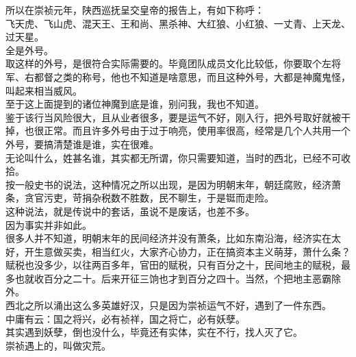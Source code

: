 \begin{multicols}{\theparacolNo}
所以在崇祯元年，陕西巡抚呈交皇帝的报告上，有如下称呼：\\

飞天虎、飞山虎、混天王、王和尚、黑杀神、大红狼、小红狼、一丈青、上天龙、过天星。\\

全是外号。\\

取这样的外号，是很符合实际需要的。毕竟团队成员文化比较低，你要取个左将军、右都督之类的称号，他也不知道是啥意思，而且这种外号，大都是神魔鬼怪，叫起来相当威风。\\

至于这上面提到的诸位神魔到底是谁，别问我，我也不知道。\\

鉴于该行当风险很大，且从业者很多，要是运气不好，刚入行，把外号取好就被干掉，也很正常。而且许多外号由于过于响亮，使用率很高，经常是几个人共用一个外号，要搞清楚谁是谁，实在很难。\\

无论叫什么，姓甚名谁，其实都无所谓，你只需要知道，当时的西北，已经不可收拾。\\

按一般史书的说法，这种情况之所以出现，是因为明朝末年，朝廷腐败，经济萧条，贪官污吏，苛捐杂税数不胜数，民不聊生，于是铤而走险。\\

这种说法，就是传说中的套话，虽说不是废话，也差不多。\\

因为事实并非如此。\\

很多人并不知道，明朝末年的民间经济并没有萧条，比如东南沿海，经济实在太好，开生意做买卖，相当红火，大家齐心协力，正在搞资本主义萌芽，萧什么条？\\

赋税也没多少，以往两百多年，官田的赋税，只有百分之十，民间地主的赋税，最多也就收百分之二十。后来开征三饷也才到百分之四十。当然，个把地主恶霸除外。\\

西北之所以涌出这么多英雄好汉，只是因为崇祯运气不好，遇到了一件东西。\\

中庸有云：国之将兴，必有祯祥，国之将亡，必有妖孽。\\

其实遇到妖孽，倒也没什么，毕竟还有实体，实在不行，找人灭了它。\\

崇祯遇上的，叫做灾荒。\\


\end{multicols}
